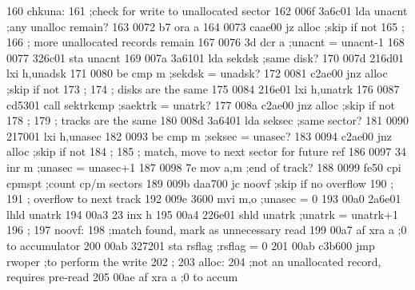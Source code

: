 160                chkuna:
161                          ;check for write to unallocated sector
162    006f 3a6c01           lda      unacnt                 ;any unalloc remain?
163    0072 b7               ora      a        
164    0073 caae00           jz       alloc                  ;skip if not
165                ;
166                ;         more unallocated records remain
167    0076 3d               dcr      a                      ;unacnt = unacnt-1
168    0077 326c01           sta      unacnt
169    007a 3a6101           lda      sekdsk                 ;same disk?
170    007d 216d01           lxi      h,unadsk
171    0080 be               cmp      m                      ;sekdsk = unadsk?
172    0081 c2ae00           jnz      alloc                  ;skip if not
173                ;
174                ;         disks are the same
175    0084 216e01           lxi      h,unatrk
176    0087 cd5301           call     sektrkcmp              ;saektrk = unatrk?
177    008a c2ae00           jnz      alloc                  ;skip if not
178                ;
179                ;         tracks are the same
180    008d 3a6401           lda      seksec                 ;same sector?
181    0090 217001           lxi      h,unasec
182    0093 be               cmp      m                      ;seksec = unasec?
183    0094 c2ae00           jnz      alloc                  ;skip if not
184                ;
185                ;         match, move to next sector for future ref
186    0097 34               inr      m                      ;unasec = unasec+1
187    0098 7e               mov      a,m                    ;end of track?
188    0099 fe50             cpi      cpmspt                 ;count cp/m sectors
189    009b daa700           jc       noovf                  ;skip if no overflow
190                ;
191                ;         overflow to next track
192    009e 3600             mvi      m,o                    ;unasec = 0
193    00a0 2a6e01           lhld     unatrk
194    00a3 23               inx      h
195    00a4 226e01           shld     unatrk                 ;unatrk = unatrk+1
196                ;
197                noovf:
198                          ;match found, mark as unnecessary read
199    00a7 af               xra      a                      ;0 to accumulator
200    00ab 327201           sta      rsflag                 ;rsflag = 0
201    00ab c3b600           jmp      rwoper                 ;to perform the write
202                ;
203                alloc:
204                          ;not an unallocated record, requires pre-read
205    00ae af               xra      a                      ;0 to accum
